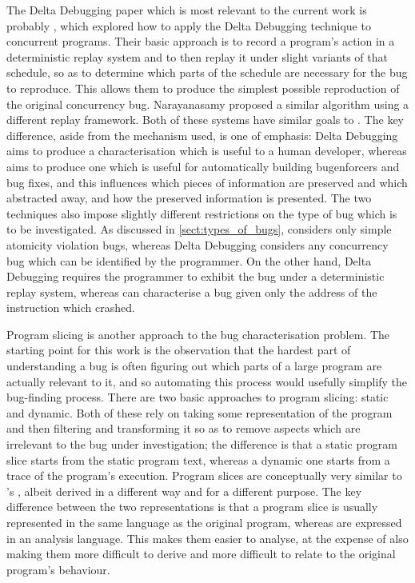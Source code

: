 The Delta Debugging paper which is most relevant to the current work
is probably \cite{Choi2002}, which explored how to
apply the Delta Debugging technique to concurrent programs.  Their
basic approach is to record a program's action in a deterministic
replay system and to then replay it under slight variants of that
schedule, so as to determine which parts of the schedule are necessary
for the bug to reproduce.  This allows them to produce the simplest
possible reproduction of the original concurrency bug.
Narayanasamy\cite{Narayanasamy2007} proposed a similar algorithm using
a different replay framework.  Both of these systems have similar
goals to {\technique}.  The key difference, aside from the mechanism
used, is one of emphasis: Delta Debugging aims to produce a
characterisation which is useful to a human developer, whereas
{\technique} aims to produce one which is useful for automatically
building \glspl{bugenforcer} and bug fixes, and this influences which
pieces of information are preserved and which abstracted away, and how
the preserved information is presented.  The two techniques also
impose slightly different restrictions on the type of bug which is to
be investigated.  As discussed in \autoref{sect:types_of_bugs},
{\technique} considers only simple atomicity violation bugs, whereas
Delta Debugging considers any concurrency bug which can be identified
by the programmer.  On the other hand, Delta Debugging requires the
programmer to exhibit the bug under a deterministic replay system,
whereas {\technique} can characterise a bug given only the address of
the instruction which crashed.

Program slicing is another approach to the bug characterisation
problem.  The starting point for this work is the observation that the
hardest part of understanding a bug is often figuring out which parts
of a large program are actually relevant to it, and so automating this
process would usefully simplify the bug-finding process.  There are
two basic approaches to program slicing: static\cite{Weiser1981} and
dynamic\cite{Agrawal1990a}.  Both of these rely on taking some
representation of the program and then filtering and transforming it
so as to remove aspects which are irrelevant to the bug under
investigation; the difference is that a static program slice starts
from the static program text, whereas a dynamic one starts from a
trace of the program's execution.  Program slices are conceptually
very similar to {\technique}'s {\StateMachines}, albeit derived in a
different way and for a different purpose.  The key difference between
the two representations is that a program slice is usually represented
in the same language as the original program, whereas {\StateMachines}
are expressed in an analysis language.  This makes them easier to
analyse, at the expense of also making them more difficult to derive
and more difficult to relate to the original program's behaviour.

